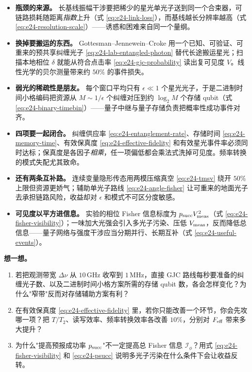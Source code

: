 \begin{itemize}
\item \textbf{瓶颈的来源。} 长基线振幅干涉要把稀少的星光单光子送到同一个合束器，可链路损耗随距离\emph{指数}上升（式 \eqref{eq:e24-link-loss}），而基线越长分辨率越高（式 \eqref{eq:e24-resolution-scale}）——诱惑和困难来自同一个量纲。
\item \textbf{换掉要搬运的东西。} Gottesman--Jennewein--Croke 用一个已知、可验证、可重来的预共享纠缠光子 \eqref{eq:e24-lab-entangled-photon} 替代长途搬运星光；扫描本地相位 \(\delta\) 就能从符合点击率 \eqref{eq:e24-gjc-probability} 读出复可见度 \(V\)。线性光学的贝尔测量带来约 \(50\%\) 的事件损失。
\item \textbf{弱光的稀疏性是朋友。} 每个窗口平均只有 \(\epsilon\ll1\) 个星光光子，于是二进制时间小格编码把资源从 \(M\sim1/\epsilon\) 个纠缠对压到约 \(\log_2 M\) 个存储 qubit（式 \eqref{eq:e24-binary-timebin}）——量子中继与量子存储负责把概率性成功事件对齐。
\item \textbf{四项要一起闭合。} 纠缠供应率 \eqref{eq:e24-entanglement-rate}、存储时间 \eqref{eq:e24-memory-time}、有效保真度 \eqref{eq:e24-effective-fidelity} 和有效星光事件率必须同时达标；保真度是各因子\emph{相乘}，任一项偏低都会乘法式洗掉可见度。频率转换的模式失配尤其致命。
\item \textbf{还有两条互补路。} 连续变量隐形传态用两模压缩真空 \eqref{eq:e24-tmsv} 绕开 \(50\%\) 上限但资源更娇气；辅助单光子路线 \eqref{eq:e24-angle-fisher} 让可重来的地面光子去承担链路风险，收益却对 \(\epsilon\) 和模式不可区分度敏感。
\item \textbf{可见度以平方进信息。} 实验的相位 Fisher 信息标度为 \(p_{\rm succ}V_{\rm meas}^2\)（式 \eqref{eq:e24-fisher-visibility}）；一味加大光强会引入多光子污染、压低 \(V_{\rm meas}\)，反而降低总信息——量子网络与强度干涉应当分期并行、长期互补（式 \eqref{eq:e24-useful-events}）。
\end{itemize}

\medskip
\noindent\textbf{想一想。}
\begin{enumerate}
\item 若把观测带宽 \(\Delta\nu\) 从 \(10\,\mathrm{GHz}\) 收窄到 \(1\,\mathrm{MHz}\)，直接 GJC 路线每秒要准备的纠缠光子数、以及二进制时间小格方案所需的存储 qubit 数，各会怎样变化？为什么"窄带"反而对存储辅助方案有利？
\item 在有效保真度 \eqref{eq:e24-effective-fidelity} 里，若你只能改善一个环节，你会先攻哪一项？把 \(T/T_2\)、读写效率、频率转换效率各改善 \(10\%\)，分别对 \(F_{\rm eff}\) 带来多大提升？
\item 为什么"提高预报成功率 \(p_{\rm succ}\)"不一定提高总 Fisher 信息 \(\mathcal I_\phi\)？用式 \eqref{eq:e24-fisher-visibility} 和 \eqref{eq:e24-psucc} 说明多光子污染在什么条件下会让收益反转。
\end{enumerate}
